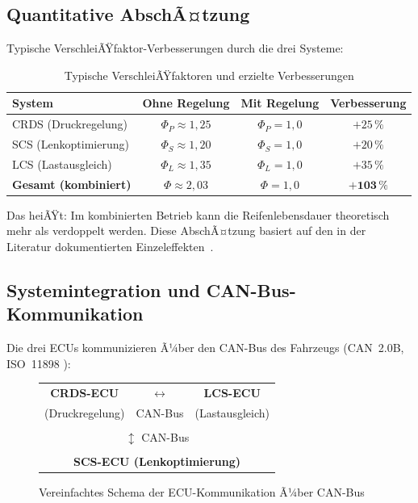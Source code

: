﻿\documentclass[12pt,a4paper]{article}
\theoremstyle{definition}
\theoremstyle{remark}
\begin{document}
\subsection{Quantitative AbschÃ¤tzung}

Typische VerschleiÃŸfaktor-Verbesserungen durch die drei Systeme:

\begin{table}[H]
\centering
\caption{Typische VerschleiÃŸfaktoren und erzielte Verbesserungen}
\label{tab:improvement}
\begin{tabular}{lccc}
\toprule
\textbf{System} & \textbf{Ohne Regelung} & \textbf{Mit Regelung} & \textbf{Verbesserung}\\
\midrule
CRDS (Druckregelung)     & $\Phi_P \approx 1{,}25$ & $\Phi_P = 1{,}0$ & $+25\,\%$ \\
SCS (Lenkoptimierung)    & $\Phi_S \approx 1{,}20$ & $\Phi_S = 1{,}0$ & $+20\,\%$ \\
LCS (Lastausgleich)      & $\Phi_L \approx 1{,}35$ & $\Phi_L = 1{,}0$ & $+35\,\%$ \\
\midrule
\textbf{Gesamt (kombiniert)} & $\Phi \approx 2{,}03$ & $\Phi = 1{,}0$ & $\mathbf{+103\,\%}$\\
\bottomrule
\end{tabular}
\end{table}

Das heiÃŸt: Im kombinierten Betrieb kann die Reifenlebensdauer theoretisch
mehr als verdoppelt werden. Diese AbschÃ¤tzung basiert auf den in der Literatur
dokumentierten Einzeleffekten~\cite{Sandberg2011, Niskanen2014, Gent2006}.

\subsection{Systemintegration und CAN-Bus-Kommunikation}

Die drei ECUs kommunizieren Ã¼ber den CAN-Bus des Fahrzeugs (CAN~2.0B,
ISO~11898 \cite{Bosch1991}):

\begin{figure}[H]
\centering
\begin{tabular}{|c|c|c|}
\hline
\textbf{CRDS-ECU} & $\longleftrightarrow$ & \textbf{LCS-ECU}\\
(Druckregelung) & CAN-Bus & (Lastausgleich)\\
\hline
\multicolumn{3}{|c|}{}\\
\multicolumn{3}{|c|}{$\updownarrow$ CAN-Bus}\\
\multicolumn{3}{|c|}{}\\
\hline
\multicolumn{3}{|c|}{\textbf{SCS-ECU (Lenkoptimierung)}}\\
\hline
\end{tabular}
\caption{Vereinfachtes Schema der ECU-Kommunikation Ã¼ber CAN-Bus}
\label{fig:can_schema}
\end{figure}
\end{document}
